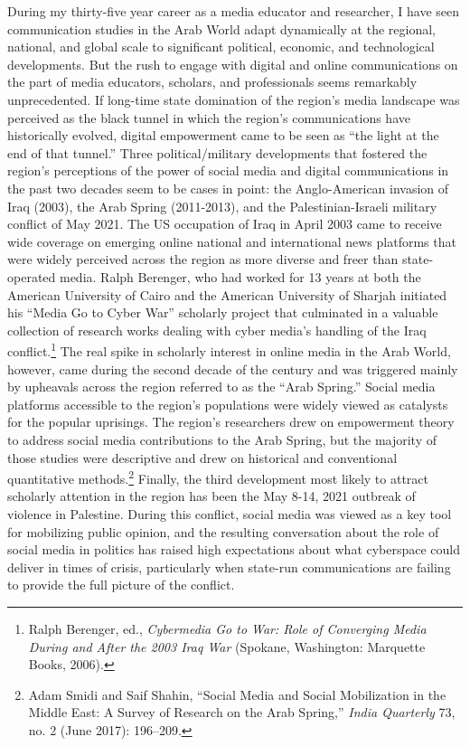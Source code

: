 \documentclass{tufte-handout}
\begin{document}
During my thirty-five year career as a media educator and researcher, I
have seen communication studies in the Arab World adapt dynamically at
the regional, national, and global scale to significant political,
economic, and technological developments. But the rush to engage with
digital and online communications on the part of media educators,
scholars, and professionals seems remarkably unprecedented. If long-time
state domination of the region's media landscape was perceived as the
black tunnel in which the region's communications have historically
evolved, digital empowerment came to be seen as ``the light at the end
of that tunnel.'' Three political/military developments that fostered
the region's perceptions of the power of social media and digital
communications in the past two decades seem to be cases in point: the
Anglo-American invasion of Iraq (2003), the Arab Spring (2011-2013), and
the Palestinian-Israeli military conflict of May 2021. The US occupation
of Iraq in April 2003 came to receive wide coverage on emerging online
national and international news platforms that were widely perceived
across the region as more diverse and freer than state-operated media.
Ralph Berenger, who had worked for 13 years at both the American
University of Cairo and the American University of Sharjah initiated his
``Media Go to Cyber War'' scholarly project that culminated in a
valuable collection of research works dealing with cyber media's
handling of the Iraq conflict.\footnote{Ralph Berenger, ed., \emph{Cybermedia Go to War: Role of Converging
  Media During and After the 2003 Iraq War} (Spokane, Washington:
  Marquette Books, 2006).
} The
real spike in scholarly interest in online media in the Arab World,
however, came during the second decade of the century and was triggered
mainly by upheavals across the region referred to as the ``Arab
Spring.'' Social media platforms accessible to the region's populations
were widely viewed as catalysts for the popular uprisings. The region's
researchers drew on empowerment theory to address social media
contributions to the Arab Spring, but the majority of those studies were
descriptive and drew on historical and conventional quantitative
methods.\footnote{ Adam Smidi and Saif Shahin, ``Social Media and Social Mobilization in
  the Middle East: A Survey of Research on the Arab Spring,''
  \emph{India Quarterly} 73, no. 2 (June 2017): 196--209.} Finally, the third
development most likely to attract scholarly attention in the region has
been the May 8-14, 2021 outbreak of violence in Palestine. During this
conflict, social media was viewed as a key tool for mobilizing public
opinion, and the resulting conversation about the role of social media
in politics has raised high expectations about what cyberspace could
deliver in times of crisis, particularly when state-run communications
are failing to provide the full picture of the conflict.
\end{document}
